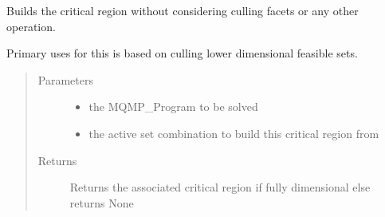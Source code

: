 \documentclass[letterpaper,10pt,english]{sphinxmanual}
\begin{document}
\begin{fulllineitems}
\label{\detokenize{ppopt.utils:ppopt.utils.mpqp_utils.build_suboptimal_critical_region}}
\sphinxAtStartPar
Builds the critical region without considering culling facets or any other operation.

\sphinxAtStartPar
Primary uses for this is based on culling lower dimensional feasible sets.
\begin{quote}\begin{description}
\item[{Parameters}] \leavevmode\begin{itemize}
\item {} 
\sphinxAtStartPar
{} \textendash{} the MQMP\_Program to be solved

\item {} 
\sphinxAtStartPar
{} \textendash{} the active set combination to build this critical region from

\end{itemize}

\item[{Returns}] \leavevmode
\sphinxAtStartPar
Returns the associated critical region if fully dimensional else returns None

\end{description}\end{quote}

\end{fulllineitems}

\end{document}
